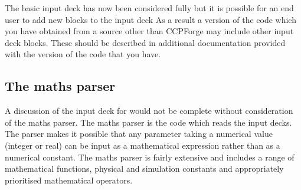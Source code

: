 The basic input deck has now been considered fully but it
 is possible for an end user to add new blocks to the input deck As a result
a version of the code which you have obtained from a source other than
CCPForge may include other input deck blocks. These should be described in
additional documentation provided with the version of the code that you have.

\subsection{The maths parser}
\label{sec:maths_parser}
A discussion of the input deck for {\EPOCH} would not be complete without
consideration of the maths parser. The maths parser is the code which reads
the input decks.
The parser makes it possible that any parameter taking a
numerical value (integer or real) can be input as a mathematical expression
rather than as a numerical constant. The maths parser is fairly extensive and
includes a range of mathematical functions, physical and simulation constants
and appropriately prioritised mathematical operators.


